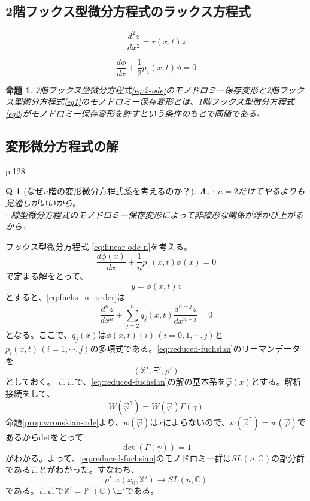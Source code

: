 \documentclass[paper=a4, fontsize=11pt]{jlreq} %
\theoremstyle{break}
\newtheorem{proposition}[theorem]{命題}
\theoremstyle{qa}
\newtheorem*{Q}{Q}
\theoremstyle{remark} %
\begin{document}
\subsection{2階フックス型微分方程式のラックス方程式}

\begin{equation}\label{eq1}
\frac{d^{2}z}{dx^{2}}=r(x,t)z
\end{equation}

\begin{equation}\label{eq2}
\frac{d\phi}{dx}+\frac{1}{2}p_{1}(x,t)\phi=0
\end{equation}

\begin{proposition}
    2階フックス型微分方程式\eqref{eq:2-ode}のモノドロミー保存変形と2階フックス型微分方程式\eqref{eq1}のモノドロミー保存変形とは、1階フックス型微分方程式\eqref{eq2}がモノドロミー保存変形を許すという条件のもとで同値である。
\end{proposition}

\subsection{変形微分方程式の解}

p.128
\begin{Q}[なぜ$n$階の変形微分方程式系を考えるのか？]
\textbf{A.} $\cdot$ $n=2$だけでやるよりも見通しがいいから。\\
$\cdot$ 線型微分方程式のモノドロミー保存変形によって非線形な関係が浮かび上がるから。
\end{Q}

フックス型微分方程式
\eqref{eq:linear-ode-n}を考える。\\
\begin{equation}\label{eq:auxiliary-phi}
\frac{d\phi(x)}{dx}+\frac{1}{n}p_{1}(x,t)\phi(x)=0
\end{equation}
で定まる解をとって、
\[
y=\phi(x,t)z
\]
とすると、\eqref{eq:fuchs_n_order}は
\begin{equation}\label{eq:reduced-fuchsian}
\frac{d^{n}z}{dx^{n}}+\sum_{j=2}^{n} q_{j}(x,t)\frac{d^{n-j}z}{dx^{n-j}} = 0
\end{equation}
となる。ここで、$q_{j}(x)$は$\phi(x,t)(i)\,(i=0,1,\cdots,j)$と$p_{i}(x,t)\,(i=1,\cdots,j)$の多項式である。\eqref{eq:reduced-fuchsian}のリーマンデータを
\[
(\mathbb{X}',\Xi',\rho')
\]
としておく。
ここで、\eqref{eq:reduced-fuchsian}の解の基本系を$\vec{\varphi}(x)$とする。解析接続をして、
\[
W(\vec{\varphi}^{\gamma})=W(\vec{\varphi})\Gamma(\gamma)
\]
命題\ref{prop:wronskian-ode}より、$w(\vec{\varphi})$は$x$によらないので、$w(\vec{\varphi}^{\gamma})=w(\vec{\varphi})$であるからdetをとって
\[
\det(\Gamma(\gamma))=1
\]
がわかる。よって、\eqref{eq:reduced-fuchsian}のモノドロミー群は$SL(n,\mathbb{C})$の部分群であることがわかった。すなわち、
\[
\rho':\pi(x_{0},\mathbb{X}')\to SL(n,\mathbb{C})
\]
である。ここで$\mathbb{X}'=\mathbb{P}^{1}(\mathbb{C})\setminus \Xi'$である。
\end{document}
